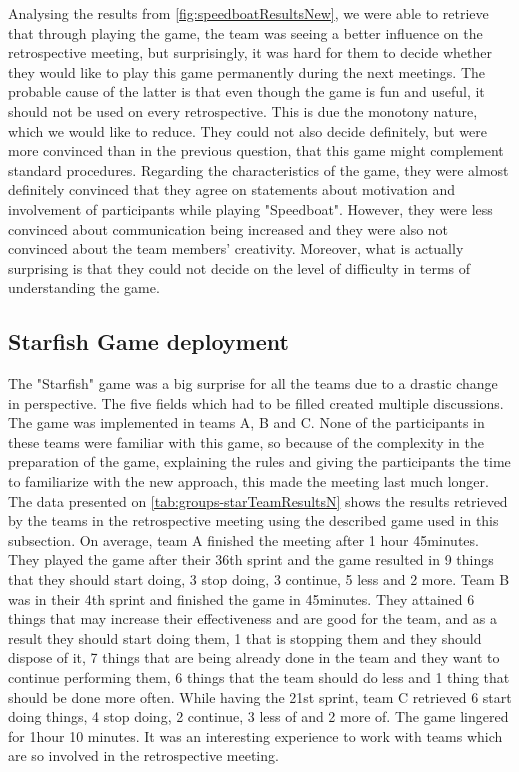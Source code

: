 Analysing the results from \autoref{fig:speedboatResultsNew}, we were able to retrieve that through playing the game, the team was seeing a better influence on the retrospective meeting, but surprisingly, it was hard for them to decide whether they would like to play this game permanently during the next meetings. The probable cause of the latter is that even though the game is fun and useful, it should not be used on every retrospective. This is due the monotony nature, which we would like to reduce. They could not also decide definitely, but were more convinced than in the previous question, that this game might complement standard procedures. Regarding the characteristics of the game, they were almost definitely convinced that they agree on statements about motivation and involvement of participants while playing "Speedboat". However, they were less convinced about communication being increased and they were also not convinced about the team members' creativity. Moreover, what is actually surprising is that they could not decide on the level of difficulty in terms of understanding the game. 
\subsection{Starfish Game deployment}

The "Starfish" game was a big surprise for all the teams due to a drastic change in perspective. The five fields which had to be filled created multiple discussions. The game was implemented in teams A, B and C. None of the participants in these teams were familiar with this game, so because of the complexity in the preparation of the game, explaining the rules and giving the participants the time to familiarize with the new approach, this made the meeting last much longer. The data presented on \autoref{tab:groups-starTeamResultsN} shows the results retrieved by the teams in the retrospective meeting using the described game used in this subsection. On average, team A finished the meeting after 1 hour 45minutes. They played the game after their 36th sprint and the game resulted in 9 things that they should start doing, 3 stop doing, 3 continue, 5 less and 2 more. Team B was in their 4th sprint and finished the game in 45minutes. They attained 6 things that may increase their effectiveness and are good for the team, and as a result they should start doing them, 1 that is stopping them and they should dispose of it, 7 things that are being already done in the team and they want to continue performing them, 6 things that the team should do less and 1 thing that should be done more often. While having the 21st sprint, team C retrieved 6 start doing things, 4 stop doing, 2 continue, 3 less of and 2 more of. The game lingered for 1hour 10 minutes. It was an interesting experience to work with teams which are so involved in the retrospective meeting.

